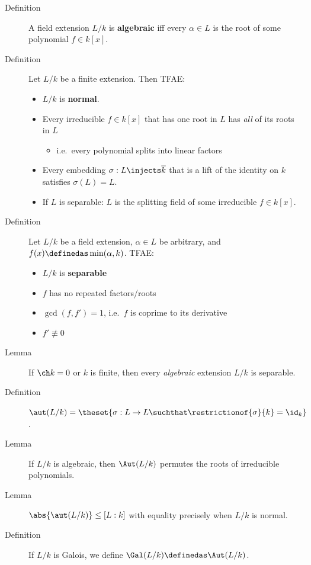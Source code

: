 \begin{description}
\item[Definition]
A field extension \(L/k\) is \textbf{algebraic} iff every
\(\alpha \in L\) is the root of some polynomial \(f\in k[x]\).
\item[Definition]
Let \(L/k\) be a finite extension. Then TFAE:

\begin{itemize}
\item
  \(L/k\) is \textbf{normal}.
\item
  Every irreducible \(f\in k[x]\) that has one root in \(L\) has
  \emph{all} of its roots in \(L\)

  \begin{itemize}
  \tightlist
  \item
    i.e.~every polynomial splits into linear factors
  \end{itemize}
\item
  Every embedding \(\sigma: L \injects \overline k\) that is a lift of
  the identity on \(k\) satisfies \(\sigma(L) = L\).
\item
  If \(L\) is separable: \(L\) is the splitting field of some
  irreducible \(f\in k[x]\).
\end{itemize}
\item[Definition]
Let \(L/k\) be a field extension, \(\alpha \in L\) be arbitrary, and
\(f(x) \definedas\min(\alpha, k)\). TFAE:

\begin{itemize}
\tightlist
\item
  \(L/k\) is \textbf{separable}
\item
  \(f\) has no repeated factors/roots
\item
  \(\gcd(f, f') = 1\), i.e.~\(f\) is coprime to its derivative
\item
  \(f' \not\equiv 0\)
\end{itemize}
\item[Lemma]
If \(\ch k = 0\) or \(k\) is finite, then every \emph{algebraic}
extension \(L/k\) is separable.
\item[Definition]
\(\aut(L/k) = \theset{\sigma: L \to L \suchthat \restrictionof{\sigma}{k} = \id_k}\).
\item[Lemma]
If \(L/k\) is algebraic, then \(\Aut(L/k)\) permutes the roots of
irreducible polynomials.
\item[Lemma]
\(\abs{\aut(L/k)} \leq [L: k]\) with equality precisely when \(L/k\) is
normal.
\item[Definition]
If \(L/k\) is Galois, we define \(\Gal(L/k) \definedas \Aut(L/k)\).
\end{description}

